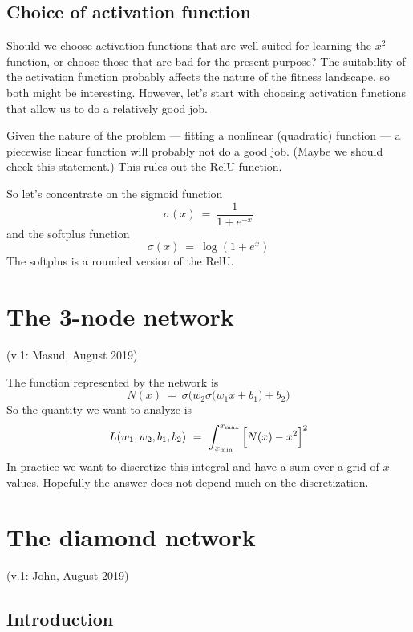 \documentclass[12pt,a4paper]{article}
\begin{document}
\subsection{Choice of activation function}

Should we choose activation functions that are well-suited for learning  the $x^2$ function, or
choose those that are bad for the present purpose?  The suitability of the activation function
probably affects the nature of the fitness landscape, so both might be interesting.  However, let's
start with choosing activation functions that allow us to do a relatively good job.  

Given the nature of the problem --- fitting a nonlinear (quadratic) function --- a piecewise linear
function will probably not do a good job.  (Maybe we should check this statement.)  This rules out
the RelU function.

So let's concentrate on the sigmoid function
\[
\sigma(x) ~=~ \frac{1}{1+e^{-x}}
\]
and the softplus function
\[
\sigma(x) ~=~ \log(1 + e^x)
\]
The softplus is a rounded version of the RelU.  



\newpage 


\section{The 3-node network}

(v.1: Masud, August 2019)

The function represented by the network is
\begin{equation}
N(x) ~=~  \sigma\Big( w_2 \sigma\big(w_1x+b_1\big) +b_2 \Big)
\end{equation}
So the quantity we want to analyze is
\begin{equation}
L(w_1,w_2,b_1,b_2) ~=~  \int_{x_{\rm min}}^{x_{\rm max}} \Big[ N(x) -x^2 \Big]^2 
\end{equation}
In practice we want to discretize this integral and have a sum over a grid of $x$ values.  Hopefully
the answer does not depend much on the discretization.  



\newpage

\section{The diamond network}

(v.1: John, August 2019)

\subsection{Introduction}
\end{document}
